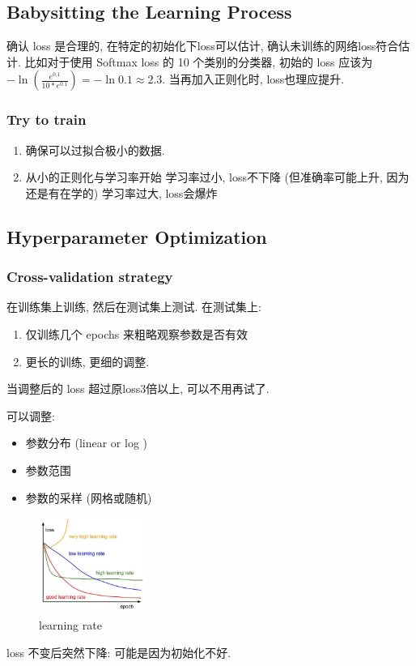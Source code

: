 \subsection{Babysitting the Learning Process}
确认 loss 是合理的, 在特定的初始化下loss可以估计, 确认未训练的网络loss符合估计. 比如对于使用 Softmax loss 的 10 个类别的分类器, 初始的 loss 应该为 $-\ln \left( \frac{e^{0.1}}{10*e^{0.1}} \right)= -\ln 0.1 \approx 2.3$. 当再加入正则化时, loss也理应提升. 

\subsubsection{Try to train}
\begin{enumerate}
    \item 确保可以过拟合极小的数据. 
    \item 从小的正则化与学习率开始
    \subitem 学习率过小, loss不下降 (但准确率可能上升, 因为还是有在学的)
    \subitem 学习率过大, loss会爆炸
\end{enumerate}

\subsection{Hyperparameter Optimization}
\subsubsection{Cross-validation strategy}
在训练集上训练, 然后在测试集上测试. 在测试集上:
\begin{enumerate}
    \item 仅训练几个 epochs 来粗略观察参数是否有效
    \item 更长的训练, 更细的调整. 
\end{enumerate}
当调整后的 loss 超过原loss3倍以上, 可以不用再试了. 

可以调整:
\begin{itemize}
    \item 参数分布 (linear or log )
    \item 参数范围
    \item 参数的采样 (网格或随机)
\end{itemize}

\begin{figure}[!htb]
    \centering
    \includegraphics[width=0.309\textwidth]{pic/Lec6/learning rate.png}
    \caption{learning rate}
\end{figure}

loss 不变后突然下降: 可能是因为初始化不好. 